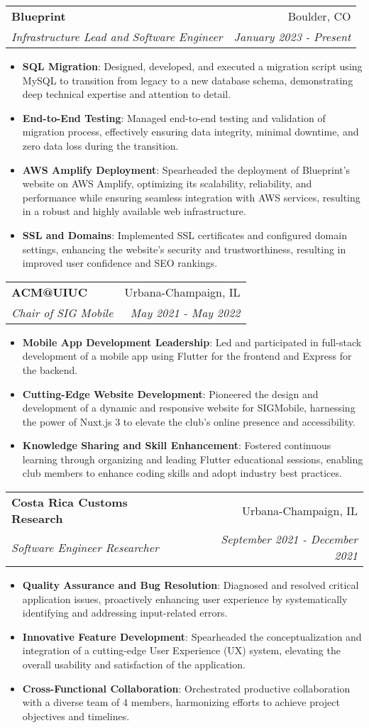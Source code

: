 \documentclass[letterpaper,11pt]{article}
\makeatletter
\newcommand{\resumeItem}[2]{
  \item\small{
    \textbf{#1}{: #2 \vspace{-2pt}}
  }
}
\newcommand{\resumeSubheading}[4]{
  \vspace{-1pt}\item
    \begin{tabular*}{0.97\textwidth}[t]{l@{\extracolsep{\fill}}r}
      \textbf{#1} & #2 \\
      \textit{\small#3} & \textit{\small #4} \\
    \end{tabular*}\vspace{-8pt}
}
\newcommand{\resumeItemListStart}{\begin{itemize}}
\newcommand{\resumeItemListEnd}{\end{itemize}\vspace{-8pt}}
\makeatother
\begin{document}
\resumeSubheading
{Blueprint}{Boulder, CO}
{Infrastructure Lead and Software Engineer}{January 2023 - Present}
\resumeItemListStart
\resumeItem{SQL Migration}
{Designed, developed, and executed a migration script using MySQL to transition from legacy to a new database schema, demonstrating deep technical expertise and attention to detail.}
\resumeItem{End-to-End Testing}
{Managed end-to-end testing and validation of migration process, effectively ensuring data integrity, minimal downtime, and zero data loss during the transition.}
\resumeItem{AWS Amplify Deployment}
{Spearheaded the deployment of Blueprint's website on AWS Amplify, optimizing its scalability, reliability, and performance while ensuring seamless integration with AWS services, resulting in a robust and highly available web infrastructure.}
\resumeItem{SSL and Domains}
{Implemented SSL certificates and configured domain settings, enhancing the website's security and trustworthiness, resulting in improved user confidence and SEO rankings.}
\resumeItemListEnd

\resumeSubheading
{ACM@UIUC}{Urbana-Champaign, IL}
{Chair of SIG Mobile}{May 2021 - May 2022}
\resumeItemListStart
\resumeItem{Mobile App Development Leadership}
{Led and participated in full-stack development of a mobile app using Flutter for the frontend and Express for the backend.}
\resumeItem{Cutting-Edge Website Development}
{Pioneered the design and development of a dynamic and responsive website for SIGMobile, harnessing the power of Nuxt.js 3 to elevate the club's online presence and accessibility.}
\resumeItem{Knowledge Sharing and Skill Enhancement}
{Fostered continuous learning through organizing and leading Flutter educational sessions, enabling club members to enhance coding skills and adopt industry best practices.}
\resumeItemListEnd

\resumeSubheading
{Costa Rica Customs Research}{Urbana-Champaign, IL}
{Software Engineer Researcher}{September 2021 - December 2021}
\resumeItemListStart
\resumeItem{Quality Assurance and Bug Resolution}
{Diagnosed and resolved critical application issues, proactively enhancing user experience by systematically identifying and addressing input-related errors.}
\resumeItem{Innovative Feature Development}
{Spearheaded the conceptualization and integration of a cutting-edge User Experience (UX) system, elevating the overall usability and satisfaction of the application.}
\resumeItem{Cross-Functional Collaboration}
{Orchestrated productive collaboration with a diverse team of 4 members, harmonizing efforts to achieve project objectives and timelines.}
\resumeItemListEnd
\end{document}
